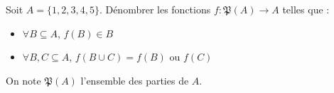 Soit $A = \{1, 2, 3, 4, 5\}$. Dénombrer les fonctions $f : \mathfrak{P}(A) \to A$ telles que :
\begin{itemize}
\item $\forall B \subseteq A$, $f(B) \in B$
\item $\forall B, C \subseteq A$, $f(B \cup C) = f(B)$ ou $f(C)$
\end{itemize}
On note $\mathfrak{P}(A)$ l'ensemble des parties de $A$.
